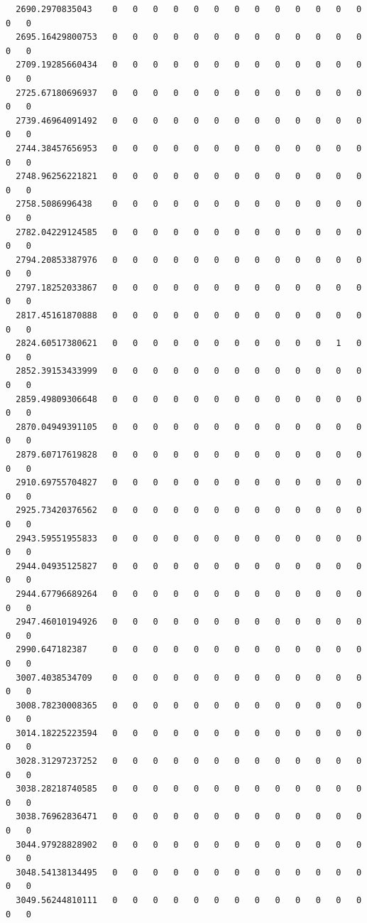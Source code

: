 \documentclass[
  letterpaper,
  DIV=11,
  numbers=noendperiod]{scrartcl}
\begin{document}
\begin{verbatim}
  2690.2970835043    0   0   0   0   0   0   0   0   0   0   0   0   0   0   0
  2695.16429800753   0   0   0   0   0   0   0   0   0   0   0   0   0   0   0
  2709.19285660434   0   0   0   0   0   0   0   0   0   0   0   0   0   0   0
  2725.67180696937   0   0   0   0   0   0   0   0   0   0   0   0   0   0   0
  2739.46964091492   0   0   0   0   0   0   0   0   0   0   0   0   0   0   0
  2744.38457656953   0   0   0   0   0   0   0   0   0   0   0   0   0   0   0
  2748.96256221821   0   0   0   0   0   0   0   0   0   0   0   0   0   0   0
  2758.5086996438    0   0   0   0   0   0   0   0   0   0   0   0   0   0   0
  2782.04229124585   0   0   0   0   0   0   0   0   0   0   0   0   0   0   0
  2794.20853387976   0   0   0   0   0   0   0   0   0   0   0   0   0   0   0
  2797.18252033867   0   0   0   0   0   0   0   0   0   0   0   0   0   0   0
  2817.45161870888   0   0   0   0   0   0   0   0   0   0   0   0   0   0   0
  2824.60517380621   0   0   0   0   0   0   0   0   0   0   0   1   0   0   0
  2852.39153433999   0   0   0   0   0   0   0   0   0   0   0   0   0   0   0
  2859.49809306648   0   0   0   0   0   0   0   0   0   0   0   0   0   0   0
  2870.04949391105   0   0   0   0   0   0   0   0   0   0   0   0   0   0   0
  2879.60717619828   0   0   0   0   0   0   0   0   0   0   0   0   0   0   0
  2910.69755704827   0   0   0   0   0   0   0   0   0   0   0   0   0   0   0
  2925.73420376562   0   0   0   0   0   0   0   0   0   0   0   0   0   0   0
  2943.59551955833   0   0   0   0   0   0   0   0   0   0   0   0   0   0   0
  2944.04935125827   0   0   0   0   0   0   0   0   0   0   0   0   0   0   0
  2944.67796689264   0   0   0   0   0   0   0   0   0   0   0   0   0   0   0
  2947.46010194926   0   0   0   0   0   0   0   0   0   0   0   0   0   0   0
  2990.647182387     0   0   0   0   0   0   0   0   0   0   0   0   0   0   0
  3007.4038534709    0   0   0   0   0   0   0   0   0   0   0   0   0   0   0
  3008.78230008365   0   0   0   0   0   0   0   0   0   0   0   0   0   0   0
  3014.18225223594   0   0   0   0   0   0   0   0   0   0   0   0   0   0   0
  3028.31297237252   0   0   0   0   0   0   0   0   0   0   0   0   0   0   0
  3038.28218740585   0   0   0   0   0   0   0   0   0   0   0   0   0   0   0
  3038.76962836471   0   0   0   0   0   0   0   0   0   0   0   0   0   0   0
  3044.97928828902   0   0   0   0   0   0   0   0   0   0   0   0   0   0   0
  3048.54138134495   0   0   0   0   0   0   0   0   0   0   0   0   0   0   0
  3049.56244810111   0   0   0   0   0   0   0   0   0   0   0   0   0   0   0

\end{verbatim}
\end{document}
